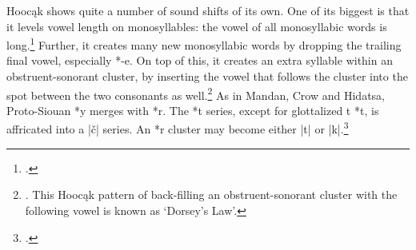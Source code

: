 \documentclass[output=paper]{LSP/langsci}
\begin{document}
Hooc\k{a}k shows quite a number of sound shifts of its own.  One of its biggest is that it levels vowel length on monosyllables: the vowel of all monosyllabic words is long.\footnote{\citealt[303, 797]{CSD2006}.} Further, it creates many new monosyllabic words by dropping the trailing final vowel, especially *-e.  On top of this, it creates an extra syllable within an obstruent-sonorant cluster, by inserting the vowel that follows the cluster into the spot between the two consonants as well.\footnote{\citet[123--124]{Helmbrecht2011}. This Hooc\k{a}k pattern of back-filling an obstruent-sonorant cluster with the following vowel is known as `Dorsey's Law'.}  As in Mandan, Crow and Hidatsa, Proto-Siouan *y merges with *r.  The *t series, except for glottalized t *t\textsuperscript{}, is affricated into a |\v{c}| series.  An *r\textsuperscript{} cluster may become either |t\textsuperscript{}| or |k\textsuperscript{}|.\footnote{\citealt[816-817]{CSD2006}.}
\end{document}

